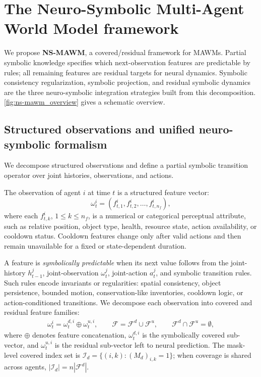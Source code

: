 \documentclass{article}
\theoremstyle{plain}
\theoremstyle{definition}
\theoremstyle{remark}
\begin{document}
\section{The Neuro-Symbolic Multi-Agent World Model framework}
\label{sec:method}
\label{sec:nsmawm}

We propose \textbf{NS-MAWM}, a covered/residual framework for MAWMs. Partial symbolic knowledge specifies which next-observation features are predictable by rules; all remaining features are residual targets for neural dynamics. Symbolic consistency regularization, symbolic projection, and residual symbolic dynamics are the three neuro-symbolic integration strategies built from this decomposition. \autoref{fig:ns-mawm_overview} gives a schematic overview.

\subsection{Structured observations and unified neuro-symbolic formalism}
\label{sec:ns}

We decompose structured observations and define a partial symbolic transition operator over joint histories, observations, and actions.

The observation of agent $i$ at time $t$ is a structured feature vector:
\begin{equation*}
  \omega^i_t = (f^i_{t,1}, f^i_{t,2}, \dots, f^i_{t,n_f}),
\end{equation*}
where each $f^i_{t,k}$, $1\leq k\leq n_f$, is a numerical or categorical perceptual attribute, such as relative position, object type, health, resource state, action availability, or cooldown status. Cooldown features change only after valid actions and then remain unavailable for a fixed or state-dependent duration.

A feature is \emph{symbolically predictable} when its next value follows from the joint-history $h^j_{t-1}$, joint-observation $\omega^j_t$, joint-action $a^j_t$, and symbolic transition rules. Such rules encode invariants or regularities: spatial consistency, object persistence, bounded motion, conservation-like inventories, cooldown logic, or action-conditioned transitions. We decompose each observation into covered and residual feature families:
\begin{equation*}
  \begin{aligned}
    \omega^i_t
    =
    \omega^{d,i}_t \oplus \omega^{u,i}_t,
    \qquad
    \mathcal{F} = \mathcal{F}^d \cup \mathcal{F}^u,
    \qquad
    \mathcal{F}^d \cap \mathcal{F}^u = \emptyset ,
  \end{aligned}
\end{equation*}
where $\oplus$ denotes feature concatenation, $\omega^{d,i}_t$ is the symbolically covered sub-vector, and $\omega^{u,i}_t$ is the residual sub-vector left to neural prediction. The mask-level covered index set is $\mathcal{I}_d=\{(i,k):(M_d)_{i,k}=1\}$; when coverage is shared across agents, $|\mathcal{I}_d|=n|\mathcal{F}^d|$.
\end{document}
